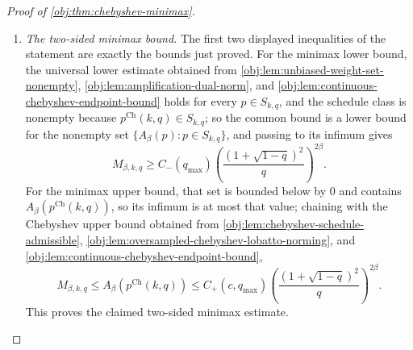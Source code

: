 \begin{proof}[Proof of \cref{obj:thm:chebyshev-minimax}]
\begin{enumerate}
\item \emph{The two-sided minimax bound.}
The first two displayed inequalities of the statement are exactly the bounds just proved. For the minimax
lower bound, the universal lower estimate obtained from \cref{obj:lem:unbiased-weight-set-nonempty}, \cref{obj:lem:amplification-dual-norm}, and \cref{obj:lem:continuous-chebyshev-endpoint-bound} holds for every \(p\in S_{k,q}\), and the schedule class is
nonempty because \(p^{\mathrm{Ch}}(k,q)\in S_{k,q}\); so the common bound is a lower bound for the nonempty set \(\{A_\beta(p):p\in S_{k,q}\}\), and passing to its infimum gives
\[
M_{\beta,k,q}
\ge
C_-(q_{\max})
\left(\frac{(1+\sqrt{1-q})^2}{q}\right)^{2\beta}.
\]
For the minimax upper bound, that set is bounded below by \(0\) and contains \(A_\beta(p^{\mathrm{Ch}}(k,q))\), so its infimum is at most that value; chaining with the Chebyshev upper bound obtained from \cref{obj:lem:chebyshev-schedule-admissible}, \cref{obj:lem:oversampled-chebyshev-lobatto-norming}, and \cref{obj:lem:continuous-chebyshev-endpoint-bound},
\[
M_{\beta,k,q}
\le
A_\beta\!\left(p^{\mathrm{Ch}}(k,q)\right)
\le
C_+(c,q_{\max})
\left(\frac{(1+\sqrt{1-q})^2}{q}\right)^{2\beta}.
\]
This proves the claimed two-sided minimax estimate.
\end{enumerate}
\end{proof}

